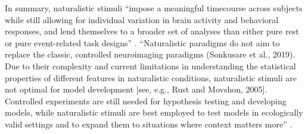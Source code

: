 %
In summary, naturalistic stimuli ``impose a meaningful timecourse across
subjects while still allowing for individual variation in brain activity and
behavioral responses, and lend themselves to a broader set of analyses than
either pure rest or pure event-related task designs'' \citep{finn2017can}.
%
``Naturalistic paradigms do not aim to replace the classic, controlled
neuroimaging paradigms (Sonkusare et al., 2019). Due to their complexity and
current limitations in understanding the statistical properties of different
features in naturalistic conditions, naturalistic stimuli are not optimal for
model development [see, e.g., Rust and Movshon, 2005]. Controlled experiments
are still needed for hypothesis testing and developing models, while
naturalistic stimuli are best employed to test models in ecologically valid
settings and to expand them to situations where context matters
more'' \citep{saarimaki2021naturalistic}.
